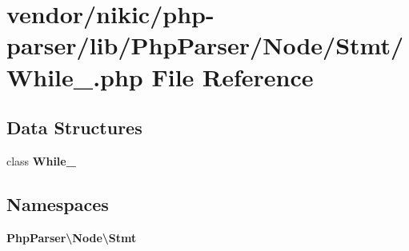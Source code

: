 \section{vendor/nikic/php-\/parser/lib/\+Php\+Parser/\+Node/\+Stmt/\+While\+\_\+.php File Reference}
\label{_while___8php}
\subsection*{Data Structures}
\begin{DoxyCompactItemize}
\item 
class {\bf While\+\_\+}
\end{DoxyCompactItemize}
\subsection*{Namespaces}
\begin{DoxyCompactItemize}
\item 
 {\bf Php\+Parser\textbackslash{}\+Node\textbackslash{}\+Stmt}
\end{DoxyCompactItemize}
